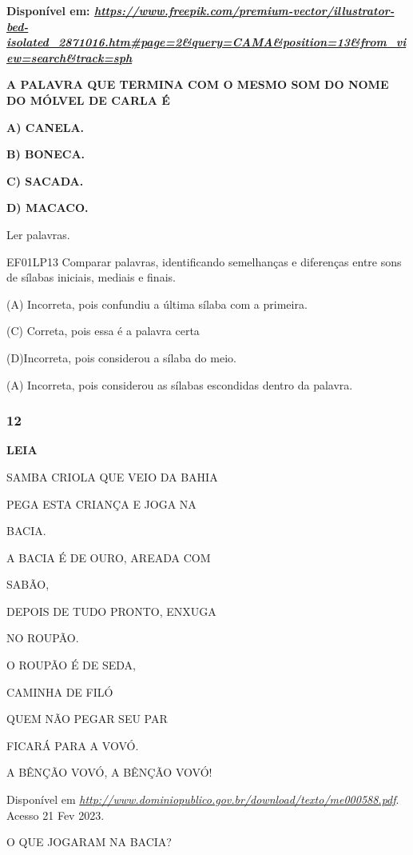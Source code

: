\begin{escola}
\textbf{Disponível em:
\href{https://www.freepik.com/premium-vector/illustrator-bed-isolated_2871016.htm\#page=2\&query=CAMA\&position=13\&from_view=search\&track=sph}{\emph{https://www.freepik.com/premium-vector/illustrator-bed-isolated\_2871016.htm\#page=2\&query=CAMA\&position=13\&from\_view=search\&track=sph}}}

\textbf{A PALAVRA QUE TERMINA COM O MESMO SOM DO NOME DO MÓLVEL DE CARLA
É}

\textbf{A) CANELA.}

\textbf{B) BONECA.}

\textbf{C) SACADA.}

\textbf{D) MACACO.}

Ler palavras.

EF01LP13 Comparar palavras, identificando semelhanças e diferenças entre
sons de sílabas iniciais, mediais e finais.

(A) Incorreta, pois confundiu a última sílaba com a primeira.

(C) Correta, pois essa é a palavra certa

(D)Incorreta, pois considerou a sílaba do meio.

(A) Incorreta, pois considerou as sílabas escondidas dentro da palavra.

\subsubsection{12}\label{section-68}

\textbf{LEIA}

SAMBA CRIOLA QUE VEIO DA BAHIA

PEGA ESTA CRIANÇA E JOGA NA

BACIA.

A BACIA É DE OURO, AREADA COM

SABÃO,

DEPOIS DE TUDO PRONTO, ENXUGA

NO ROUPÃO.

O ROUPÃO É DE SEDA,

CAMINHA DE FILÓ

QUEM NÃO PEGAR SEU PAR

FICARÁ PARA A VOVÓ.

A BÊNÇÃO VOVÓ, A BÊNÇÃO VOVÓ!

Disponível em
\href{http://www.dominiopublico.gov.br/download/texto/me000588.pdf}{\emph{http://www.dominiopublico.gov.br/download/texto/me000588.pdf}}.
Acesso 21 Fev 2023.

O QUE JOGARAM NA BACIA?


\end{escola}
